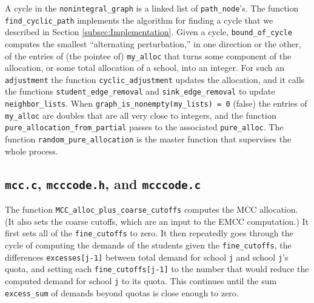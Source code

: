 \documentclass[12pt]{article}
\theoremstyle{definition}
\begin{document}
\begin{appendix}
A cycle in the \texttt{nonintegral\_graph} is a linked list of
\texttt{path\_node}'s.  The function \texttt{find\_cyclic\_path}
implements the algorithm for finding a cycle that we described in
Section \ref{subsec:Implementation}.  Given a cycle,
\texttt{bound\_of\_cycle} computes the smallest ``alternating
perturbation,'' in one direction or the other, of the entries of (the
pointee of) \texttt{my\_alloc} that turns some component of the
allocation, or some total allocation of a school, into an integer.
For such an \texttt{adjustment} the function
\texttt{cyclic\_adjustment} updates the allocation, and it calls the
functions \texttt{student\_edge\_removal} and
\texttt{sink\_edge\_removal} to update \texttt{neighbor\_lists}.
When \texttt{graph\_is\_nonempty(my\_lists) = 0} (false) the entries
of \texttt{my\_alloc} are doubles that are all very close to integers,
and the function \texttt{pure\_allocation\_from\_partial} passes to
the associated \texttt{pure\_alloc}.  The function
\texttt{random\_pure\_allocation} is the master function that
supervises the whole process.

\subsection{\texttt{mcc.c}, \texttt{mcccode.h}, and \texttt{mcccode.c}}

The function \texttt{MCC\_alloc\_plus\_coarse\_cutoffs} computes the
MCC allocation.  (It also sets the coarse cutoffs, which are an input
to the EMCC computation.)  It first sets all of the
\texttt{fine\_cutoffs} to zero.  It then repeatedly goes through the
cycle of computing the demands of the students given the
\texttt{fine\_cutoffs}, the differences \texttt{excesses[j-1]} between
total demand for school \texttt{j} and school \texttt{j}'s quota, and
setting each \texttt{fine\_cutoffs[j-1]} to the number that would
reduce the computed demand for school \texttt{j} to its quota.  This
continues until the sum \texttt{excess\_sum} of demands beyond quotas
is close enough to zero.


\end{appendix}
\end{document}
